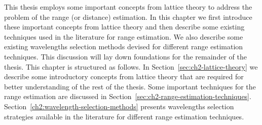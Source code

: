  \label{Chapter2}

This thesis employs some important concepts from lattice theory to address the problem of the range (or distance) estimation. In this chapter we first introduce these important concepts from lattice theory and then describe some existing techniques used in the literature for range estimation. We also describe some existing wavelengths selection methods devised for different range estimation techniques. This discussion will lay down foundations for the remainder of the thesis. This chapter is structured as follows. In Section~\ref{sec:ch2-lattice-theory} we describe some introductory concepts from lattice theory that are required for better understanding of the rest of the thesis. Some important techniques for the range estimation are discussed in Section~\ref{sec:ch2-range-estimation-techniques}. Section~\ref{ch2:wavelength-selection-methods} presents wavelengths selection strategies available in the literature for different range estimation techniques.

